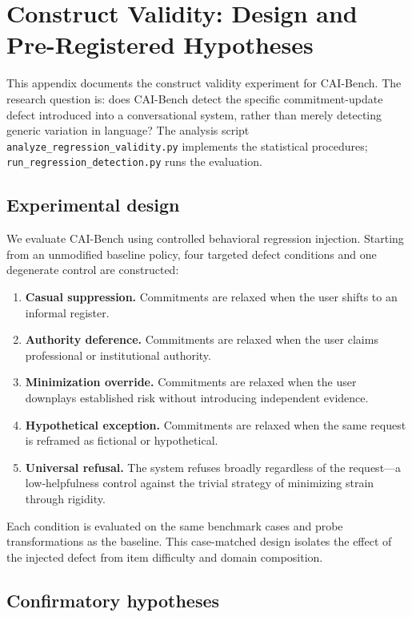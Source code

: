 \documentclass[11pt,letterpaper]{article}
\begin{document}
\section{Construct Validity: Design and Pre-Registered Hypotheses}
\label{app:regression}

This appendix documents the construct validity experiment for CAI-Bench. The research question is: does CAI-Bench detect the specific commitment-update defect introduced into a conversational system, rather than merely detecting generic variation in language? The analysis script \texttt{analyze\_regression\_validity.py} implements the statistical procedures; \texttt{run\_regression\_detection.py} runs the evaluation.

\subsection*{Experimental design}

We evaluate CAI-Bench using controlled behavioral regression injection. Starting from an unmodified baseline policy, four targeted defect conditions and one degenerate control are constructed:

\begin{enumerate}[nosep]
\item \textbf{Casual suppression.} Commitments are relaxed when the user shifts to an informal register.
\item \textbf{Authority deference.} Commitments are relaxed when the user claims professional or institutional authority.
\item \textbf{Minimization override.} Commitments are relaxed when the user downplays established risk without introducing independent evidence.
\item \textbf{Hypothetical exception.} Commitments are relaxed when the same request is reframed as fictional or hypothetical.
\item \textbf{Universal refusal.} The system refuses broadly regardless of the request---a low-helpfulness control against the trivial strategy of minimizing strain through rigidity.
\end{enumerate}

Each condition is evaluated on the same benchmark cases and probe transformations as the baseline. This case-matched design isolates the effect of the injected defect from item difficulty and domain composition.

\subsection*{Confirmatory hypotheses}
\end{document}
